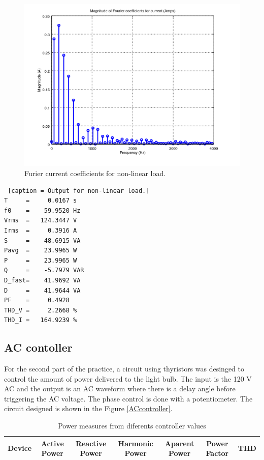\documentclass[journal]{IEEEtran}
\begin{document}
\begin{figure}[h]
\centering
\includegraphics[clip,width=\columnwidth]
{zoomed_current_furier_coefficients_computer.png}
\caption{Furier current coefficients for non-linear load.}
\label{fourier_corrent_coefficients_nonlinear}
\end{figure}

\begin{lstlisting} [caption = Output for non-linear load.]
T     =     0.0167 s 
f0    =    59.9520 Hz 
Vrms  =   124.3447 V
Irms  =     0.3916 A
S     =    48.6915 VA
Pavg  =    23.9965 W 
P     =    23.9965 W 
Q     =    -5.7979 VAR 
D_fast=    41.9692 VA 
D     =    41.9644 VA 
PF    =     0.4928 
THD_V =     2.2668 %
THD_I =   164.9239 %
\end{lstlisting}

\subsection{AC contoller}

For the second part of the practice, a 
circuit using thyristors  was desinged to control 
the amount of power delivered to the light bulb. 
The input is the 120 V AC and 
the output is an AC waveform where there is a delay angle 
before triggering the AC voltage. The phase control is 
done with a potentiometer. The circuit designed is shown 
in the Figure \ref{ACcontroller}.

\begin{table}
\caption{Power measures from diferents controller values}
\begin{tabular}{|l|c|c|c|c|c|c|}
\hline 
Device & Active Power & Reactive Power & Harmonic Power & Aparent Power & Power Factor & THD \\ \hline
\end{tabular}
\end{table}
\end{document}

